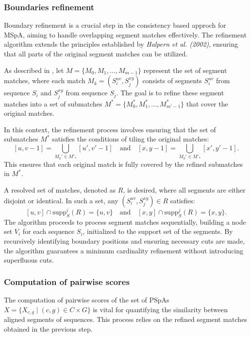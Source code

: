 \documentclass[12pt,oneside,letterpaper,english]{article}
\begin{document}
\subsubsection{Boundaries refinement}

Boundary refinement is a crucial step in the consistency based approch for MSpA, aiming to handle overlapping segment matches effectively. 
The refinement algorithm extends the principles established by \textit{Halpern et al. (2002)}, ensuring that all parts of the original segment 
matches can be utilized. 

As described in \textit{\cite{feng1987progressive}}, let \( M = \{M_0, M_1, \ldots, M_{m-1}\} \) represent the set of segment matches, where each match \( M_k = (S_i^{uv}, S_j^{xy}) \) 
consists of segments \( S_i^{uv} \) from sequence \( S_i \) and \( S_j^{xy} \) from sequence \( S_j \). The goal is to refine these segment 
matches into a set of submatches \( M^* = \{M_0^*, M_1^*, \ldots, M_{m'-1}^*\} \) that cover the original matches.

In this context, the refinement process involves ensuring that the set of submatches \( M^* \) satisfies the conditions of tiling the 
original matches:
\[
[u, v - 1] = \bigcup_{M_k' \in M'_*} [u', v' - 1] \quad \text{and} \quad [x, y - 1] = \bigcup_{M_k' \in M'_*} [x', y' - 1].
\]
This ensures that each original match is fully covered by the refined submatches in \( M^* \). 

A resolved set of matches, denoted as \( R \), is desired, where all segments are either disjoint or identical. In such a set, any \( (S_i^{uv}, S_j^{xy}) \in R \) satisfies:
\[
[u, v] \cap \text{supp}_S^i(R) = \{u, v\} \quad \text{and} \quad [x, y] \cap \text{supp}_S^j(R) = \{x, y\}.
\]
The algorithm proceeds to process segment matches sequentially, building a node set \( V_i \) for each sequence \( S_i \), initialized to the support set of the segments. By recursively identifying boundary positions and ensuring necessary cuts are made, the algorithm guarantees a minimum cardinality refinement without introducing superfluous cuts.

%  

\subsubsection{Computation of pairwise scores}

The computation of pairwise scores of the set of PSpAs \( X = \{ X_{c,g} \mid (c, g) \in C \times G \} \) is vital for quantifying the similarity between aligned segments of 
sequences. This process relies on the refined segment matches obtained in the previous step. 
\end{document}
